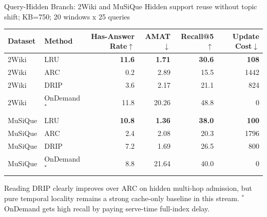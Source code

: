 \documentclass[aspectratio=169,10pt]{beamer}
\newcommand{\en}[1]{{\latinfont #1}}
\newcommand{\dive}{\en{DRIP}}
\newcommand{\arc}{\en{ARC}}
\newcommand{\lru}{\en{LRU}}
\newcommand{\ond}{\en{OnDemand}}
\begin{document}
\begin{frame}{Query-Hidden Branch: 2Wiki and MuSiQue}
  \scriptsize
  \en{Hidden support reuse without topic shift; KB=750; 20 windows x 25 queries}

  \begin{table}
  \centering
  \renewcommand{\arraystretch}{1.08}
  \setlength{\tabcolsep}{4.2pt}
  \begin{tabular}{llrrrr}
    \toprule
    Dataset & Method & \shortstack{\en{Has-Answer}\\\en{Rate}$\uparrow$} & \en{AMAT}$\downarrow$ & \en{Recall@5}$\uparrow$ & \shortstack{\en{Update}\\\en{Cost}$\downarrow$} \\
    \midrule
    \en{2Wiki} & \lru{} & \textbf{11.6} & \textbf{1.71} & \textbf{30.6} & \textbf{108} \\
    \en{2Wiki} & \arc{} & 0.2 & 2.89 & 15.5 & 1442 \\
    \en{2Wiki} & \dive{} & 3.6 & 2.17 & 21.1 & 824 \\
    \en{2Wiki} & \ond{}$^*$ & 11.8 & 20.26 & 48.8 & 0 \\
    \midrule
    \en{MuSiQue} & \lru{} & \textbf{10.8} & \textbf{1.36} & \textbf{38.0} & \textbf{100} \\
    \en{MuSiQue} & \arc{} & 2.4 & 2.08 & 20.3 & 1796 \\
    \en{MuSiQue} & \dive{} & 7.2 & 1.69 & 26.5 & 800 \\
    \en{MuSiQue} & \ond{}$^*$ & 8.8 & 21.64 & 40.0 & 0 \\
    \bottomrule
  \end{tabular}
  \end{table}

  \begin{block}{Reading}
    \dive{} clearly improves over \arc{} on hidden multi-hop admission, but
    pure temporal locality remains a strong cache-only baseline in this stream.
    $^*$\ond{} gets high recall by paying serve-time full-index delay.
  \end{block}
\end{frame}
\end{document}
